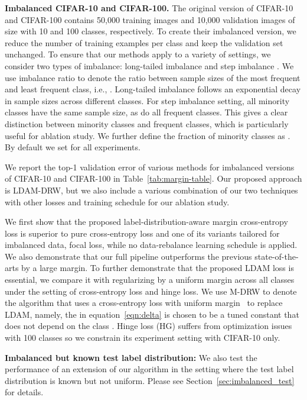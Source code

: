 \documentclass{article}
\newcommand{\ldam}{\textup{LDAM}}
\newcommand{\tstagew}{DRW}
\begin{document}
 


\textbf{Imbalanced CIFAR-10 and CIFAR-100.} The original version of CIFAR-10 and CIFAR-100 contains 50,000 training images and 10,000 validation images of size  with 10 and 100 classes, respectively. To create their imbalanced version, we reduce the number of training examples per class and keep the validation set unchanged. To ensure that our methods apply to a variety of settings, we consider two types of imbalance: long-tailed imbalance \citep{cui2019classbalancedloss} and step imbalance \citep{buda2018systematic}. We use imbalance ratio  to denote the ratio between sample sizes of the most frequent and least frequent class, i.e., . Long-tailed imbalance follows an exponential decay in sample sizes across different classes. For step imbalance setting, all minority classes have the same sample size, as do all frequent classes. This gives a clear distinction between minority classes and frequent classes, which is particularly useful for ablation study. We further define the fraction of minority classes as . By default we set  for all experiments. 

We report the top-1 validation error of various methods for imbalanced versions of CIFAR-10 and CIFAR-100 in Table~\ref{tab:margin-table}. Our proposed approach is \ldam{}-\tstagew{}, but we also include a various combination of our two techniques with other losses and training schedule for our ablation study. 

We first show that the proposed label-distribution-aware margin cross-entropy loss is superior to pure cross-entropy loss and one of its variants tailored for imbalanced data, focal loss, while no data-rebalance learning schedule is applied. We also demonstrate that our full pipeline outperforms the previous state-of-the-arts by a large margin. 
To further demonstrate that the proposed LDAM loss is essential, we compare it with regularizing by a uniform margin across all classes under the setting of cross-entropy loss and hinge loss. We use M-DRW to denote the algorithm that uses a cross-entropy loss with uniform margin~\citep{wang2018additive} to replace \ldam, namely, the  in equation~\eqref{eqn:delta} is chosen to be a tuned constant that does not depend on the class . Hinge loss (HG) suffers from optimization issues with 100 classes so we constrain its experiment setting with CIFAR-10 only.

\textbf{Imbalanced but known test label distribution: } We also test the performance of an extension of our algorithm in the setting where the test label distribution is known but not uniform. Please see Section~\ref{sec:imbalanced_test} for details.
\end{document}
